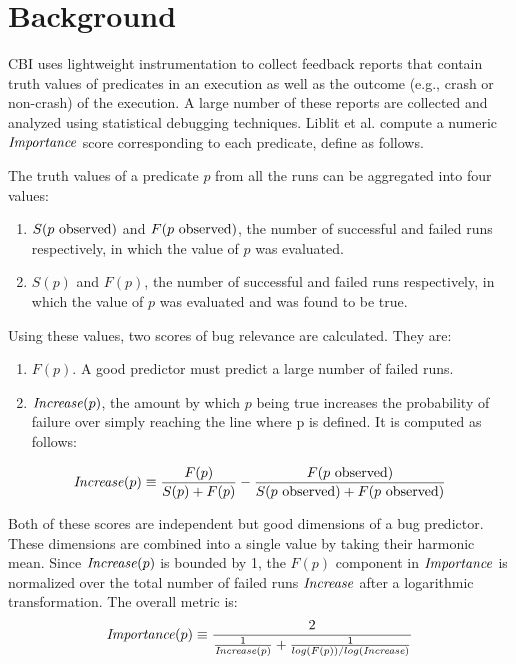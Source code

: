 
\section{Background}
\label{sec-bground}
CBI uses lightweight instrumentation to collect feedback reports that contain truth values of predicates in an execution as well as the outcome (e.g., crash or non-crash) of the execution.  A large number of these reports are collected and analyzed using statistical debugging techniques.  Liblit et al. \cite{Liblit:2005:SSBI} compute a numeric $\mathit{Importance}$ score corresponding to each predicate, define as follows.

The truth values of a predicate $p$ from all the runs can be aggregated into four values:

\begin{enumerate}
\item $S(\text{$p$ observed})$ and $F(\text{$p$ observed})$, the number of successful and failed runs respectively, in which the value of $p$ was evaluated.
\item $S(p)$ and $F(p)$, the number of successful and failed runs respectively, in which the value of $p$ was evaluated and was found to be true.
\end{enumerate}

Using these values, two scores of bug relevance are calculated.  They are:
\begin{enumerate}
\item $F(p)$.  A good predictor must predict a large number of failed runs.
\item $\mathit{Increase}(p)$, the amount by which $p$ being true increases the probability of failure over simply reaching the line where p is defined.  It is computed as follows:
\end{enumerate}

\begin{equation}
\label{eqn1}
\mathit{Increase}(p) \equiv
\frac{F(p)}{S(p) + F(p)}
-
\frac{F(\text{$p$ observed})}{S(\text{$p$ observed}) + F(\text{$p$ observed})}
\end{equation}

Both of these scores are independent but good dimensions of a bug predictor.  These dimensions are combined into a single value by taking their harmonic mean.  Since $\mathit{Increase}(p)$ is bounded by 1, the $F(p)$ component in $\mathit{Importance}$ is normalized over the total number of failed runs $\mathit{Increase}$ after a logarithmic transformation.  The overall metric is:
\begin{equation}
\label{eqn2}
\Importance(p) \equiv
\frac{2}{%
  \frac{1}{\Increase(p)}
  +
  \frac{1}{log(F(p)) / log(\NumF)}}
\end{equation}

